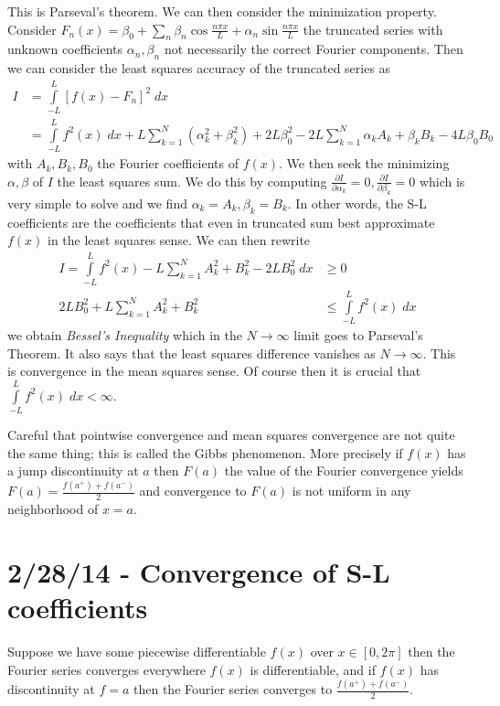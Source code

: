 \documentclass[10pt]{report}
\newcommand{\pd}[2]{\frac{\partial #1}{\partial#2}}
\begin{document}
This is Parseval's theorem. We can then consider the minimization property. Consider $F_n(x) = \beta_0 + \sum_{n}\beta_n\cos \frac{n\pi x}{L} + \alpha_n \sin \frac{n\pi x}{L}$ the truncated series with unknown coefficients $\alpha_n, \beta_n$ not necessarily the correct Fourier components. Then we can consider the least squares accuracy of the truncated series as
\begin{align}
    I &= \displaystyle\int\limits_{-L}^{L}\left[ f(x) - F_n \right]^2\;dx\\
    &= \displaystyle\int\limits_{-L}^{L}f^2(x)\;dx + L\sum_{k=1}^{N}(\alpha_k^2 + \beta_k^2) + 2L\beta_0^2 - 2L\sum_{k=1}^{N}\alpha_kA_k + \beta_k B_k - 4L\beta_0B_0
\end{align}
with $A_k, B_k, B_0$ the Fourier coefficients of $f(x)$. We then seek the minimizing $\alpha,\beta$ of $I$ the least squares sum. We do this by computing $\pd{I}{\alpha_k} = 0, \pd{I}{\beta_k} = 0$ which is very simple to solve and we find $\alpha_k = A_k, \beta_k = B_k$. In other words, the S-L coefficients are the coefficients that even in truncated sum best approximate $f(x)$ in the least squares sense. We can then rewrite
\begin{align}
    I = \displaystyle\int\limits_{-L}^{L}f^2(x) - L\sum_{k=1}^{N}A_k^2 + B_k^2 - 2LB_0^2\;dx &\geq 0\\
    2LB_0^2 + L\sum_{k=1}^{N}A_k^2 + B_k^2 &\leq \displaystyle\int\limits_{-L}^{L}f^2(x)\;dx
\end{align}
we obtain \emph{Bessel's Inequality} which in the $N \to \infty$ limit goes to Parseval's Theorem. It also says that the least squares difference vanishes as $N \to \infty$. This is convergence in the mean squares sense. Of course then it is crucial that $\displaystyle\int\limits_{-L}^{L}f^2(x)\;dx < \infty$. 

Careful that pointwise convergence and mean squares convergence are not quite the same thing; this is called the Gibbs phenomenon. More precisely if $f(x)$ has a jump discontinuity at $a$ then $F(a)$ the value of the Fourier convergence yields $F(a) = \frac{f(a^+) + f(a^-)}{2}$ and convergence to $F(a)$ is not uniform in any neighborhood of $x=a$. 
\chapter{2/28/14 - Convergence of S-L coefficients}

Suppose we have some piecewise differentiable $f(x)$ over $x \in [0,2\pi]$ then the Fourier series converges everywhere $f(x)$ is differentiable, and if $f(x)$ has discontinuity at $f=a$ then the Fourier series converges to $\frac{f(a^+) + f(a^-)}{2}$. 
\end{document}

